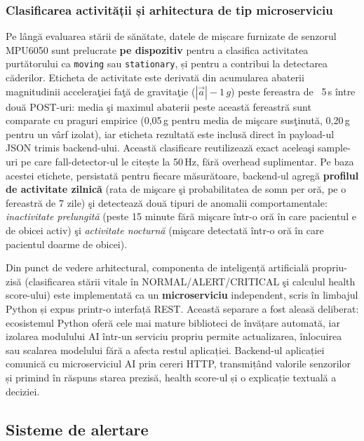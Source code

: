 ﻿\documentclass[12pt,a4paper,twoside]{article}
\begin{document}
\subsubsection{Clasificarea activității și arhitectura de tip microserviciu}

Pe lângă evaluarea stării de sănătate, datele de mișcare furnizate de senzorul MPU6050 sunt prelucrate \textbf{pe dispozitiv} pentru a clasifica activitatea purtătorului ca \texttt{moving} sau \texttt{stationary}, și pentru a contribui la detectarea căderilor. Eticheta de activitate este derivată din acumularea abaterii magnitudinii acceleraţiei faţă de gravitaţie ($|\vec{a}| - 1\,g$) peste fereastra de ~5\,s între două POST-uri: media şi maximul abaterii peste această fereastră sunt comparate cu praguri empirice (0,05\,g pentru media de mişcare susţinută, 0,20\,g pentru un vârf izolat), iar eticheta rezultată este inclusă direct în payload-ul JSON trimis backend-ului. Această clasificare reutilizează exact aceleaşi sample-uri pe care fall-detector-ul le citește la 50\,Hz, fără overhead suplimentar. Pe baza acestei etichete, persistată pentru fiecare măsurătoare, backend-ul agregă \textbf{profilul de activitate zilnică} (rata de mişcare şi probabilitatea de somn per oră, pe o fereastră de 7 zile) şi detectează două tipuri de anomalii comportamentale: \textit{inactivitate prelungită} (peste 15 minute fără mişcare într-o oră în care pacientul e de obicei activ) şi \textit{activitate nocturnă} (mişcare detectată într-o oră în care pacientul doarme de obicei).

Din punct de vedere arhitectural, componenta de inteligență artificială propriu-zisă (clasificarea stării vitale în NORMAL/ALERT/CRITICAL şi calculul health score-ului) este implementată ca un \textbf{microserviciu} independent, scris în limbajul Python și expus printr-o interfață REST. Această separare a fost aleasă deliberat: ecosistemul Python oferă cele mai mature biblioteci de învățare automată, iar izolarea modulului AI într-un serviciu propriu permite actualizarea, înlocuirea sau scalarea modelului fără a afecta restul aplicației. Backend-ul aplicației comunică cu microserviciul AI prin cereri HTTP, transmițând valorile senzorilor și primind în răspuns starea prezisă, health score-ul și o explicație textuală a deciziei.

\subsection{Sisteme de alertare}
\end{document}

